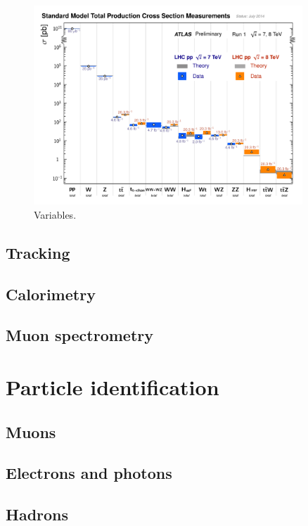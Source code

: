 \begin{figure}[tp]
  \centering
  \includegraphics[width=0.90\textwidth]{figures/lhc-atlas/ATLAS_a_SMSummary_TotalXsect}
  \caption{Variables.}
  \label{fig:atlas-measurements}
\end{figure}

\subsection{Tracking}
\subsection{Calorimetry}
\subsection{Muon spectrometry}

\section{Particle identification}
\subsection{Muons}
\subsection{Electrons and photons}
\subsection{Hadrons}
